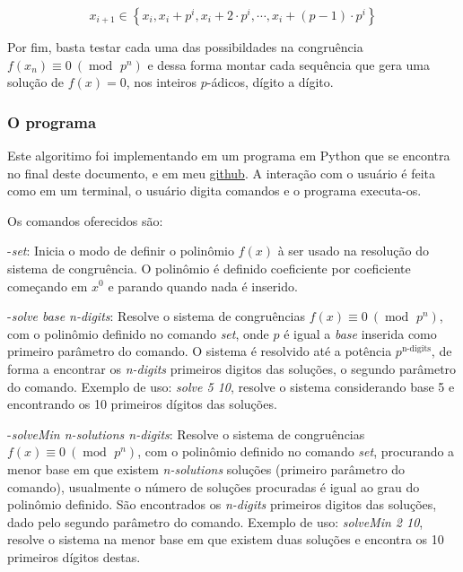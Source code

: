 \documentclass{report}
\DeclareMathOperator{\modulo}{mod \ }
\theoremstyle{definition}
\begin{document}
\begin{equation}
    x_{i+1} \in \left\lbrace x_i, x_i + p^i, x_i + 2\cdot p^i, \cdots, x_i + (p-1) \cdot p^i \right\rbrace
\end{equation}

Por fim, basta testar cada uma das possibildades na congruência $f(x_n) \equiv 0 \ (\modulo p^n)$ e dessa forma montar cada sequência que gera uma solução de $f(x) = 0$, nos inteiros $p$-ádicos, dígito a dígito.

\subsubsection*{O programa}

Este algoritimo foi implementando em um programa em Python que se encontra no final deste documento, e em meu \href{https://github.com/ThiagoMaxPavao/PICME/blob/master/programas/resolveSistemaQualquer.py}{github}. A interação com o usuário é feita como em um terminal, o usuário digita comandos e o programa executa-os.

\smallskip

Os comandos oferecidos são:

\bigskip

-\emph{set}: Inicia o modo de definir o polinômio $f(x)$ à ser usado na resolução do sistema de congruência. O polinômio é definido coeficiente por coeficiente começando em $x^0$ e parando quando nada é inserido.

\bigskip

-\emph{solve base n-digits}: Resolve o sistema de congruências $f(x) \equiv 0 \ (\modulo p^n)$, com o polinômio definido no comando \emph{set}, onde $p$ é igual a \emph{base} inserida como primeiro parâmetro do comando. O sistema é resolvido até a potência $p^{\text{n-digits}}$, de forma a encontrar os \emph{n-digits} primeiros digitos das soluções, o segundo parâmetro do comando. Exemplo de uso: \emph{solve 5 10}, resolve o sistema considerando base 5 e encontrando os 10 primeiros dígitos das soluções.

\bigskip

-\emph{solveMin n-solutions n-digits}: Resolve o sistema de congruências $f(x) \equiv 0 \ (\modulo p^n)$, com o polinômio definido no comando \emph{set}, procurando a menor base em que existem \emph{n-solutions} soluções (primeiro parâmetro do comando), usualmente o número de soluções procuradas é igual ao grau do polinômio definido. São encontrados os \emph{n-digits} primeiros digitos das soluções, dado pelo segundo parâmetro do comando. Exemplo de uso: \emph{solveMin 2 10}, resolve o sistema na menor base em que existem duas soluções e encontra os 10 primeiros dígitos destas.
\end{document}
